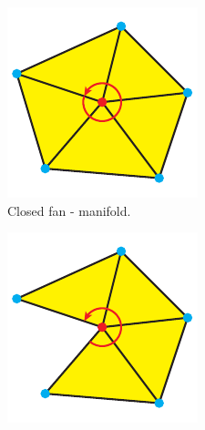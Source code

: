 \begin{description}
	\begin{figure}[H]
		\centering
		\begin{subfigure}[b]{0.3\textwidth}
			\centering
			\includegraphics[width=\textwidth]{images/closed_fan}
			\caption{
				Closed fan - manifold.
			}
			\label{fig:closed_fan}
		\end{subfigure}
		\begin{subfigure}[b]{0.3\textwidth}
			\centering
			\includegraphics[width=\textwidth]{images/open_fan}

\end{subfigure}
\end{figure}
\end{description}
